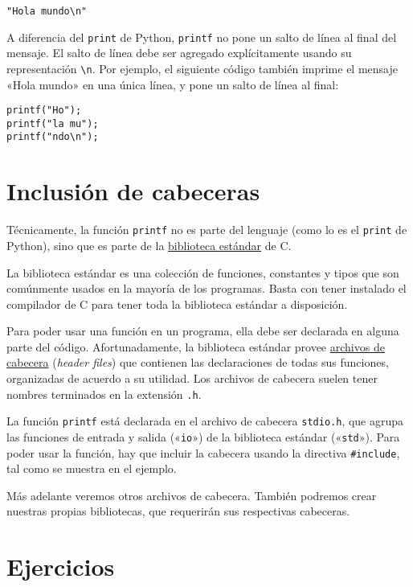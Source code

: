 \begin{lstlisting}
"Hola mundo\n"
\end{lstlisting}

A diferencia del \lstinline!print! de Python, \lstinline!printf! no pone
un salto de línea al final del mensaje. El salto de línea debe ser
agregado explícitamente usando su representación \lstinline!\n!. Por
ejemplo, el siguiente código también imprime el mensaje «Hola mundo» en
una única línea, y pone un salto de línea al final:

\begin{lstlisting}
printf("Ho");
printf("la mu");
printf("ndo\n");
\end{lstlisting}

\section{Inclusión de cabeceras}

Técnicamente, la función \lstinline!printf! no es parte del lenguaje
(como lo es el \lstinline!print! de Python), sino que es parte de la
\href{http://es.wikipedia.org/wiki/Biblioteca\_est\%C3\%A1ndar\_de\_C}{biblioteca
estándar} de C.

La biblioteca estándar es una colección de funciones, constantes y tipos
que son comúnmente usados en la mayoría de los programas. Basta con
tener instalado el compilador de C para tener toda la biblioteca
estándar a disposición.

Para poder usar una función en un programa, ella debe ser declarada en
alguna parte del código. Afortunadamente, la biblioteca estándar provee
\href{http://es.wikipedia.org/wiki/Archivo\_de\_cabecera}{archivos de
cabecera} (\emph{header files}) que contienen las declaraciones de todas
sus funciones, organizadas de acuerdo a su utilidad. Los archivos de
cabecera suelen tener nombres terminados en la extensión \lstinline!.h!.

La función \lstinline!printf! está declarada en el archivo de cabecera
\lstinline!stdio.h!, que agrupa las funciones de entrada y salida
(«\lstinline!io!») de la biblioteca estándar («\lstinline!std!»). Para
poder usar la función, hay que incluir la cabecera usando la directiva
\lstinline!#include!, tal como se muestra en el ejemplo.

Más adelante veremos otros archivos de cabecera. También podremos crear
nuestras propias bibliotecas, que requerirán sus respectivas cabeceras.

\section{Ejercicios}

